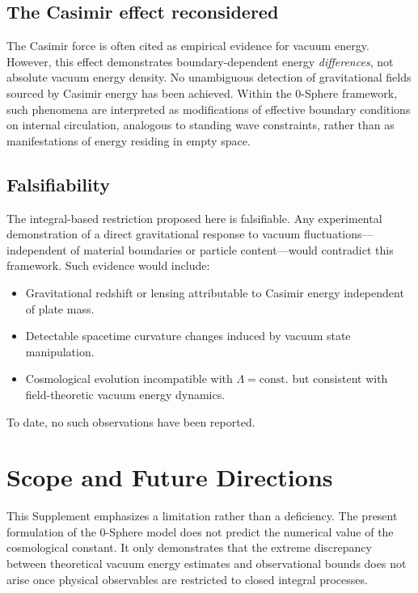 \documentclass[12pt,letterpaper]{article}
\begin{document}
\subsection{The Casimir effect reconsidered}

The Casimir force is often cited as empirical evidence for vacuum energy. However, this effect demonstrates boundary-dependent energy \emph{differences}, not absolute vacuum energy density. No unambiguous detection of gravitational fields sourced by Casimir energy has been achieved. Within the 0-Sphere framework, such phenomena are interpreted as modifications of effective boundary conditions on internal circulation, analogous to standing wave constraints, rather than as manifestations of energy residing in empty space.

\subsection{Falsifiability}

The integral-based restriction proposed here is falsifiable. Any experimental demonstration of a direct gravitational response to vacuum fluctuations—independent of material boundaries or particle content—would contradict this framework. Such evidence would include:
\begin{itemize}
\item Gravitational redshift or lensing attributable to Casimir energy independent of plate mass.
\item Detectable spacetime curvature changes induced by vacuum state manipulation.
\item Cosmological evolution incompatible with $\Lambda = \mathrm{const.}$ but consistent with field-theoretic vacuum energy dynamics.
\end{itemize}

To date, no such observations have been reported.



\section{Scope and Future Directions}

This Supplement emphasizes a limitation rather than a deficiency. The present formulation of the 0-Sphere model does not predict the numerical value of the cosmological constant. It only demonstrates that the extreme discrepancy between theoretical vacuum energy estimates and observational bounds does not arise once physical observables are restricted to closed integral processes.
\end{document}
